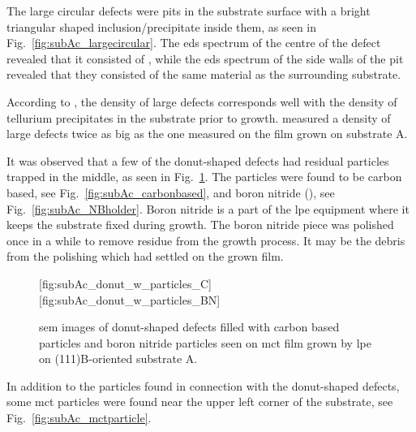 The large circular defects were pits in the substrate surface with a bright triangular shaped inclusion/precipitate inside them, as seen in Fig.~\ref{fig:subAc_largecircular}. The \ac{eds} spectrum of the centre of the defect revealed that it consisted of , while the \ac{eds} spectrum of the side walls of the pit revealed that they consisted of the same material as the surrounding substrate. %

According to \citet{pelliciari1994te}, the density of large defects corresponds well with the density of tellurium precipitates in the substrate prior to growth. \citet{pelliciari1994te} measured a density of large defects twice as big as the one measured on the film grown on substrate A. 

It was observed that a few of the donut-shaped defects had residual particles trapped in the middle, as seen in Fig.~\ref{fig:subAc_donut_w_particles}. The particles were found to be carbon based, see Fig.~\ref{fig:subAc_carbonbased}, and boron nitride (), see Fig.~\ref{fig:subAc_NBholder}. Boron nitride is a part of the \ac{lpe} equipment where it keeps the substrate fixed during growth. The boron nitride piece was polished once in a while to remove residue from the growth process. It may be the debris from the polishing which had settled on the grown film.

\begin{figure}[htbp]
    \centering
    [fig:subAc_donut_w_particles_C]
    \hfill
    [fig:subAc_donut_w_particles_BN]
    \caption[\Ac{sem} images of donut-shaped defects filled with carbon based particles and boron nitride particles.]{\Ac{sem} images of donut-shaped defects filled with  carbon based particles and  boron nitride particles seen on \ac{mct} film grown by \ac{lpe} on (111)B-oriented substrate A.}
    \label{fig:subAc_donut_w_particles}
\end{figure}

In addition to the particles found in connection with the donut-shaped defects, some \ac{mct} particles were found near the upper left corner of the substrate, see Fig.~\ref{fig:subAc_mctparticle}.

